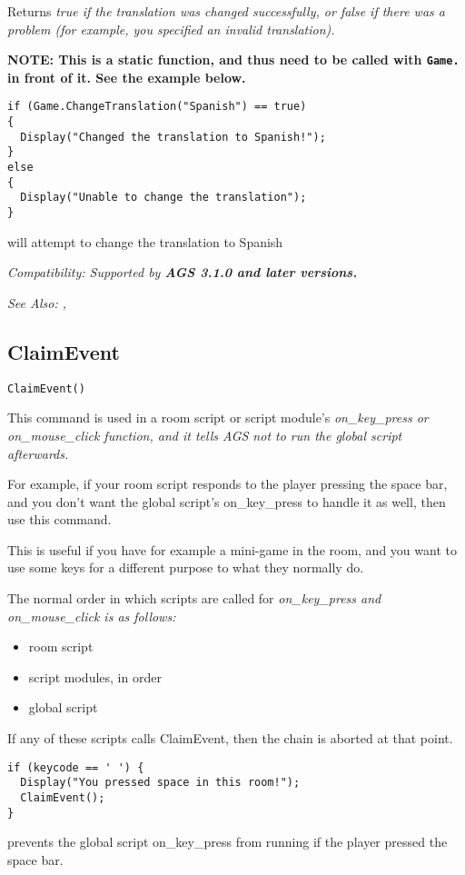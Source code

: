 Returns \it{true} if the translation was changed successfully, or \it{false} if there was a
problem (for example, you specified an invalid translation).

\bf{NOTE:} This is a static function, and thus need to be called with \verb$Game.$ in front of it. See
the example below.

\begin{verbatim}
if (Game.ChangeTranslation("Spanish") == true)
{
  Display("Changed the translation to Spanish!");
}
else
{
  Display("Unable to change the translation");
}
\end{verbatim}
will attempt to change the translation to Spanish

\it{Compatibility:} Supported by \bf{AGS 3.1.0} and later versions.

\it{See Also:} ,


\subsection{ClaimEvent}\label{ClaimEvent}%

\begin{verbatim}
ClaimEvent()
\end{verbatim}

This command is used in a room script or script module's \it{on_key_press} or
\it{on_mouse_click} function, and it tells AGS not to run the global script afterwards.

For example, if your room script responds to the player pressing the space bar, and
you don't want the global script's on_key_press to handle it as well, then use this
command.

This is useful if you have for example a mini-game in the room, and you want to use
some keys for a different purpose to what they normally do.

The normal order in which scripts are called for \it{on_key_press} and \it{on_mouse_click}
is as follows:
\begin{itemize}
\item room script
\item script modules, in order
\item global script
\end{itemize}
If any of these scripts calls ClaimEvent, then the chain is aborted at that point.

\begin{verbatim}
if (keycode == ' ') {
  Display("You pressed space in this room!");
  ClaimEvent();
}
\end{verbatim}
prevents the global script on_key_press from running if the player pressed the space bar.

